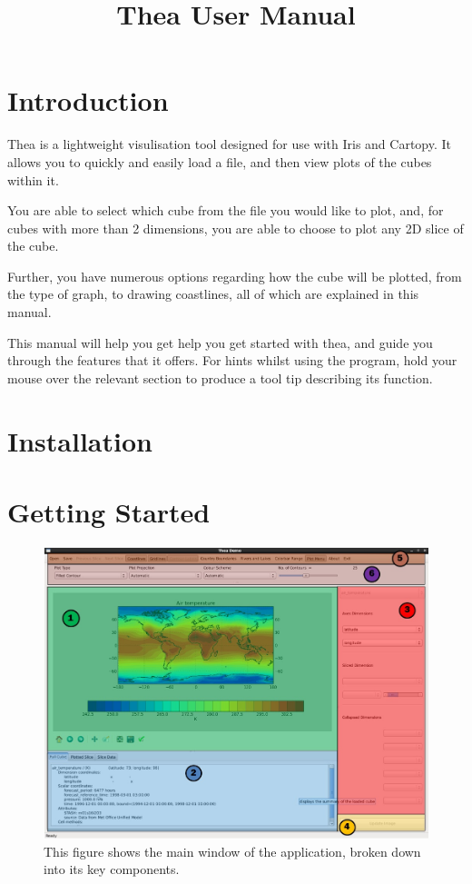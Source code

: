 \documentclass[a4paper,12pt]{article}
\begin{document}
\title{Thea User Manual}
\maketitle

\tableofcontents

\section{Introduction}

Thea is a lightweight visulisation tool designed for use with Iris and Cartopy.
It allows you to quickly and easily load a file, and then view plots of the cubes
within it.

You are able to select which cube from the file you would like to plot, and,
for cubes with more than 2 dimensions, you are able to choose to plot any
2D slice of the cube.

Further, you have numerous options regarding how the cube will be plotted,
from the type of graph, to drawing coastlines, all of which are explained in
this manual.

\vspace{4mm}

This manual will help you get help you get started with thea, and guide you
through the features that it offers. For hints whilst using the
program, hold your mouse over the relevant section to produce a tool
tip describing its function.

\pagebreak

\section{Installation}

\pagebreak

\section{Getting Started}

\begin{figure}[h]
\centering
\includegraphics[width=130mm]{resources/theaGuideJPEG.jpg}
\caption{This figure shows the main window of the application, broken down into
its key components.}
\label{overflow}
\end{figure}
\end{document}
